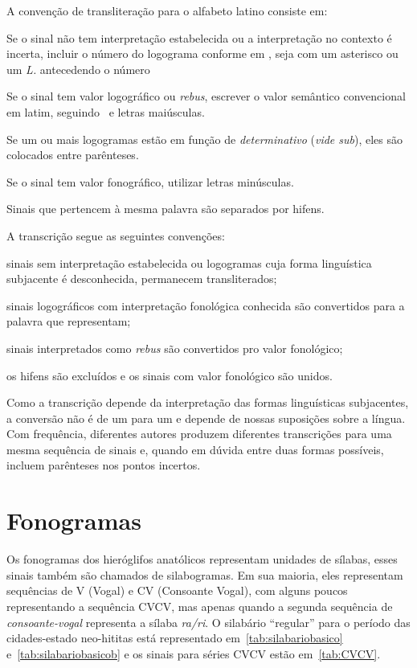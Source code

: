 \noindent A convenção de transliteração para o alfabeto latino consiste em:
\noprelistbreak%
\begin{compactenum}
	\item Se o sinal não tem interpretação estabelecida ou a interpretação no
	contexto é incerta, incluir o número do logograma conforme em
	\citet{LarocheHH}, seja com um asterisco ou um \emph{L.} antecedendo o
	número
	\item Se o sinal tem valor logográfico ou \emph{rebus},
	escrever o valor semântico convencional em latim,
	seguindo~\citet{LarocheHH} e letras maiúsculas.
	\item Se um ou mais logogramas estão em função de \emph{determinativo}
	(\emph{vide sub}), eles são colocados entre parênteses.
	\item Se o sinal tem valor fonográfico, utilizar letras minúsculas.
	\item Sinais que pertencem à mesma palavra são separados por hifens.
\end{compactenum}
A transcrição segue as seguintes convenções:
\begin{compactenum}
	\item sinais sem interpretação estabelecida ou logogramas cuja forma linguística
	subjacente é desconhecida, permanecem transliterados;
	\item sinais logográficos com interpretação fonológica conhecida são convertidos para a
	palavra que representam;
	\item sinais interpretados como \emph{rebus} são convertidos pro valor
	fonológico;
	\item os hifens são excluídos e os sinais com valor fonológico são unidos.
\end{compactenum}
Como a transcrição depende da interpretação das formas linguísticas subjacentes,
a conversão não é de um para um e depende de nossas suposições sobre a língua.
Com frequência, diferentes autores produzem diferentes transcrições para uma mesma
sequência de sinais e, quando em dúvida entre duas formas possíveis, incluem
parênteses nos pontos incertos.

\section{Fonogramas}

Os fonogramas dos hieróglifos anatólicos representam unidades de sílabas,
esses sinais também são chamados de silabogramas.
Em sua maioria, eles representam sequências de V (Vogal) e CV (Consoante Vogal),
com alguns poucos representando a sequência CVCV, mas apenas quando a segunda
sequência de \emph{consoante\hyp{}vogal} representa a sílaba \emph{ra\slash{}ri}.\@
O silabário ``regular'' para o período das cidades-estado neo-hititas está
representado em~\autoref{tab:silabariobasico} e~\autoref{tab:silabariobasicob} e
os sinais para séries CVCV estão em~\autoref{tab:CVCV}.

